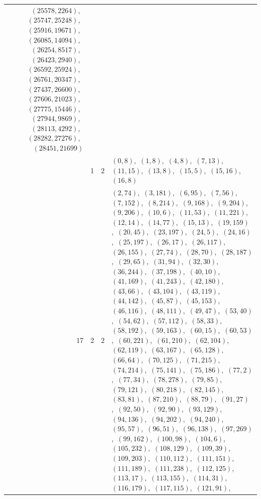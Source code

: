 \documentclass[11pt]{article}
\begin{document}
\begin{longtable}{@{}rrl>{\raggedright\arraybackslash}p{}@{}}
$(25578,2264)$,\allowbreak\ $(25747,25248)$,\allowbreak\ $(25916,19671)$,\allowbreak\ $(26085,14094)$,\allowbreak\ $(26254,8517)$,\allowbreak\ $(26423,2940)$,\allowbreak\ $(26592,25924)$,\allowbreak\ $(26761,20347)$,\allowbreak\ $(27437,26600)$,\allowbreak\ $(27606,21023)$,\allowbreak\ $(27775,15446)$,\allowbreak\ $(27944,9869)$,\allowbreak\ $(28113,4292)$,\allowbreak\ $(28282,27276)$,\allowbreak\ $(28451,21699)$\\
\addlinespace[3pt]
17 & 1 & $2$ & $(0,8)$,\allowbreak\ $(1,8)$,\allowbreak\ $(4,8)$,\allowbreak\ $(7,13)$,\allowbreak\ $(11,15)$,\allowbreak\ $(13,8)$,\allowbreak\ $(15,5)$,\allowbreak\ $(15,16)$,\allowbreak\ $(16,8)$\\
17 & 2 & $2$ & $(2,74)$,\allowbreak\ $(3,181)$,\allowbreak\ $(6,95)$,\allowbreak\ $(7,56)$,\allowbreak\ $(7,152)$,\allowbreak\ $(8,214)$,\allowbreak\ $(9,168)$,\allowbreak\ $(9,204)$,\allowbreak\ $(9,206)$,\allowbreak\ $(10,6)$,\allowbreak\ $(11,53)$,\allowbreak\ $(11,221)$,\allowbreak\ $(12,14)$,\allowbreak\ $(14,77)$,\allowbreak\ $(15,13)$,\allowbreak\ $(19,159)$,\allowbreak\ $(20,45)$,\allowbreak\ $(23,197)$,\allowbreak\ $(24,5)$,\allowbreak\ $(24,16)$,\allowbreak\ $(25,197)$,\allowbreak\ $(26,17)$,\allowbreak\ $(26,117)$,\allowbreak\ $(26,155)$,\allowbreak\ $(27,74)$,\allowbreak\ $(28,70)$,\allowbreak\ $(28,187)$,\allowbreak\ $(29,65)$,\allowbreak\ $(31,94)$,\allowbreak\ $(32,30)$,\allowbreak\ $(36,244)$,\allowbreak\ $(37,198)$,\allowbreak\ $(40,10)$,\allowbreak\ $(41,169)$,\allowbreak\ $(41,243)$,\allowbreak\ $(42,180)$,\allowbreak\ $(43,66)$,\allowbreak\ $(43,104)$,\allowbreak\ $(43,119)$,\allowbreak\ $(44,142)$,\allowbreak\ $(45,87)$,\allowbreak\ $(45,153)$,\allowbreak\ $(46,116)$,\allowbreak\ $(48,111)$,\allowbreak\ $(49,47)$,\allowbreak\ $(53,40)$,\allowbreak\ $(54,62)$,\allowbreak\ $(57,112)$,\allowbreak\ $(58,33)$,\allowbreak\ $(58,192)$,\allowbreak\ $(59,163)$,\allowbreak\ $(60,15)$,\allowbreak\ $(60,53)$,\allowbreak\ $(60,221)$,\allowbreak\ $(61,210)$,\allowbreak\ $(62,104)$,\allowbreak\ $(62,119)$,\allowbreak\ $(63,167)$,\allowbreak\ $(65,128)$,\allowbreak\ $(66,64)$,\allowbreak\ $(70,125)$,\allowbreak\ $(71,215)$,\allowbreak\ $(74,214)$,\allowbreak\ $(75,141)$,\allowbreak\ $(75,186)$,\allowbreak\ $(77,2)$,\allowbreak\ $(77,34)$,\allowbreak\ $(78,278)$,\allowbreak\ $(79,85)$,\allowbreak\ $(79,121)$,\allowbreak\ $(80,218)$,\allowbreak\ $(82,145)$,\allowbreak\ $(83,81)$,\allowbreak\ $(87,210)$,\allowbreak\ $(88,79)$,\allowbreak\ $(91,27)$,\allowbreak\ $(92,50)$,\allowbreak\ $(92,90)$,\allowbreak\ $(93,129)$,\allowbreak\ $(94,136)$,\allowbreak\ $(94,202)$,\allowbreak\ $(94,240)$,\allowbreak\ $(95,57)$,\allowbreak\ $(96,51)$,\allowbreak\ $(96,138)$,\allowbreak\ $(97,269)$,\allowbreak\ $(99,162)$,\allowbreak\ $(100,98)$,\allowbreak\ $(104,6)$,\allowbreak\ $(105,232)$,\allowbreak\ $(108,129)$,\allowbreak\ $(109,39)$,\allowbreak\ $(109,203)$,\allowbreak\ $(110,112)$,\allowbreak\ $(111,151)$,\allowbreak\ $(111,189)$,\allowbreak\ $(111,238)$,\allowbreak\ $(112,125)$,\allowbreak\ $(113,17)$,\allowbreak\ $(113,155)$,\allowbreak\ $(114,31)$,\allowbreak\ $(116,179)$,\allowbreak\ $(117,115)$,\allowbreak\ $(121,91)$,\allowbreak\ 
\end{longtable}
\end{document}
